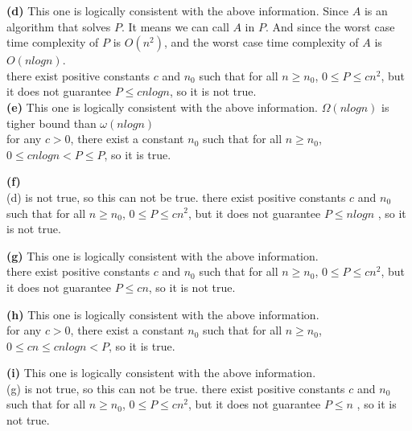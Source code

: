 \documentclass{article}
\begin{document}
\textbf{(d)} This one is logically consistent with the above information. Since $A$ is an algorithm that solves $P$. It means we can call $A$ in $P$. And since the worst case time complexity of $P$ is $O(n^2)$, and the worst case time complexity of $A$ is $O(nlogn)$.\\ \newline
there exist positive constants $c$ and $n_0$ such that for all $n\geq n_0$, $0\leq P \leq c n^2 $, but it does not guarantee $P \leq c n logn$, so it is not true.
\\ \newline
\textbf{(e)} This one is logically consistent with the above information. $\Omega(nlogn)$ is tigher bound than $\omega(nlogn)$\\ \newline
for any $c>0$, there exist a constant $n_0$ such that for all $n\geq n_0$, $0\leq c n logn < P \leq P$, so it is true. \\ \newline

\textbf{(f)} \\ \newline
(d) is not true, so this can not be true. there exist positive constants $c$ and $n_0$ such that for all $n\geq n_0$, $0\leq P \leq c n^2 $, but it does not guarantee $ P \leq nlogn$ , so it is not true.
\\ \newline

\textbf{(g)} This one is logically consistent with the above information.\\ \newline
there exist positive constants $c$ and $n_0$ such that for all $n\geq n_0$, $0\leq P \leq c n^2 $, but it does not guarantee $P \leq c n$, so it is not true.
\\ \newline

\textbf{(h)} This one is logically consistent with the above information.\\ \newline
for any $c>0$, there exist a constant $n_0$ such that for all $n\geq n_0$, $0\leq cn\leq c n logn < P $, so it is true. \\ \newline

\textbf{(i)} This one is logically consistent with the above information.\\ \newline
(g) is not true, so this can not be true. there exist positive constants $c$ and $n_0$ such that for all $n\geq n_0$, $0\leq P \leq c n^2 $, but it does not guarantee $ P \leq n$ , so it is not true.
\end{document}

